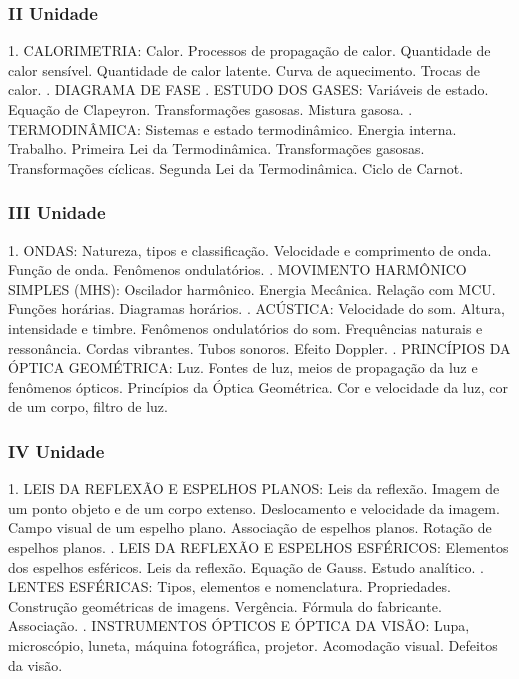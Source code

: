 \documentclass[12pt,a4paper]{book}
\begin{document}
			\subsubsection{II Unidade}			
1. CALORIMETRIA: Calor. Processos de propagação de calor. Quantidade de calor sensível. Quantidade de calor latente. Curva de aquecimento. Trocas de calor. .	DIAGRAMA DE FASE .	ESTUDO DOS GASES: Variáveis de estado. Equação de Clapeyron. Transformações gasosas. Mistura gasosa. .	TERMODINÂMICA: Sistemas e estado termodinâmico. Energia interna. Trabalho. Primeira Lei da Termodinâmica. Transformações gasosas. Transformações cíclicas. Segunda Lei da Termodinâmica. Ciclo de Carnot.

			\subsubsection{III Unidade}			
1. ONDAS: Natureza, tipos e classificação. Velocidade e comprimento de onda. Função de onda. Fenômenos ondulatórios. .	MOVIMENTO HARMÔNICO SIMPLES (MHS): Oscilador harmônico. Energia Mecânica. Relação com MCU. Funções horárias. Diagramas horários. .	ACÚSTICA: Velocidade do som. Altura, intensidade e timbre. Fenômenos ondulatórios do som. Frequências naturais e ressonância. Cordas vibrantes. Tubos sonoros. Efeito Doppler. .	PRINCÍPIOS DA ÓPTICA GEOMÉTRICA: Luz. Fontes de luz, meios de propagação da luz e fenômenos ópticos. Princípios da Óptica Geométrica. Cor e velocidade da luz, cor de um corpo, filtro de luz.

			\subsubsection{IV Unidade}
1. LEIS DA REFLEXÃO E ESPELHOS PLANOS: Leis da reflexão. Imagem de um ponto objeto e de um corpo extenso. Deslocamento e velocidade da imagem. Campo visual de um espelho plano. Associação de espelhos planos. Rotação de espelhos planos. .	LEIS DA REFLEXÃO E ESPELHOS ESFÉRICOS: Elementos dos espelhos esféricos. Leis da reflexão. Equação de Gauss. Estudo analítico. .	LENTES ESFÉRICAS: Tipos, elementos e nomenclatura. Propriedades. Construção geométricas de imagens. Vergência. Fórmula do fabricante. Associação. .	INSTRUMENTOS ÓPTICOS E ÓPTICA DA VISÃO: Lupa, microscópio, luneta, máquina fotográfica, projetor. Acomodação visual. Defeitos da visão.
		
\end{document}
